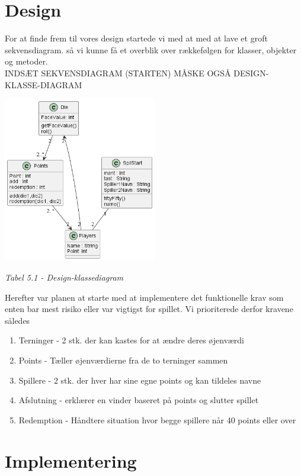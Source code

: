\documentclass{article}
\begin{document}
\section{Design}
For at finde frem til vores design startede vi med at med at lave et groft sekvensdiagram. så vi kunne få et overblik over rækkefølgen for klasser, objekter og metoder.\\
INDSÆT SEKVENSDIAGRAM (STARTEN) MÅSKE OGSÅ DESIGN-KLASSE-DIAGRAM\\
\item 
\includegraphics[width=0.50\textwidth] {Billeder/ClassDiagram.png} \item\textit{Tabel 5.1 - Design-klassediagram}\item \item
Herefter var planen at starte med at implementere det funktionelle krav som enten bar mest risiko eller var vigtigst for spillet. Vi prioriterede derfor kravene således
\begin{enumerate}
\itemsep-0.4em
    \item Terninger - 2 stk. der kan kastes for at ændre deres øjenværdi
    \item Points - Tæller øjenværdierne fra de to terninger sammen
    \item Spillere - 2 stk. der hver har sine egne points og kan tildeles navne
    \item Afslutning - erklærer en vinder baseret på points og slutter spillet
    \item Redemption - Håndtere situation hvor begge spillere når 40 points eller over
\end{enumerate}


\section{Implementering}
\end{document}

